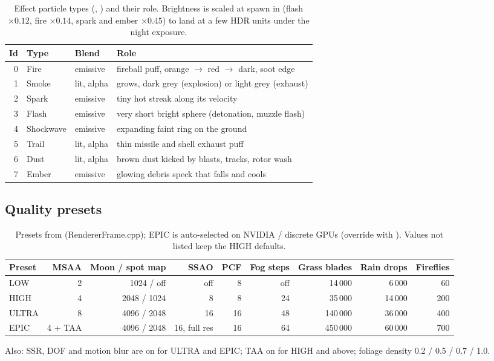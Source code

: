 \begin{table}[h]
\centering\small
\caption{Effect particle types (, ) and their role. Brightness is scaled at spawn in
 (flash $\times0.12$, fire $\times0.14$, spark and ember $\times0.45$) to land at a few HDR units under the
night exposure.}
\label{tab:fx}
\begin{tabular}{@{}rllp{9.3cm}@{}}
\toprule
Id & Type & Blend & Role\\\midrule
0 & Fire & emissive & fireball puff, orange $\to$ red $\to$ dark, soot edge\\
1 & Smoke & lit, alpha & grows, dark grey (explosion) or light grey (exhaust)\\
2 & Spark & emissive & tiny hot streak along its velocity\\
3 & Flash & emissive & very short bright sphere (detonation, muzzle flash)\\
4 & Shockwave & emissive & expanding faint ring on the ground\\
5 & Trail & lit, alpha & thin missile and shell exhaust puff\\
6 & Dust & lit, alpha & brown dust kicked by blasts, tracks, rotor wash\\
7 & Ember & emissive & glowing debris speck that falls and cools\\\bottomrule
\end{tabular}
\end{table}

\subsection{Quality presets}
\begin{table}[h]
\centering\small
\caption{Presets from  (RendererFrame.cpp); EPIC is auto-selected on NVIDIA / discrete GPUs
(override with ). Values not listed keep the HIGH defaults.}
\label{tab:presets}
\begin{tabular}{@{}lrrrrrrrr@{}}
\toprule
Preset & MSAA & Moon / spot map & SSAO & PCF & Fog steps & Grass blades & Rain drops & Fireflies\\\midrule
LOW & 2 & 1024 / off & off & 8 & off & 14\,000 & 6\,000 & 60\\
HIGH & 4 & 2048 / 1024 & 8 & 8 & 24 & 35\,000 & 14\,000 & 200\\
ULTRA & 8 & 4096 / 2048 & 16 & 16 & 48 & 140\,000 & 36\,000 & 400\\
EPIC & 4 + TAA & 4096 / 2048 & 16, full res & 16 & 64 & 450\,000 & 60\,000 & 700\\\bottomrule
\end{tabular}
\end{table}
Also: SSR, DOF and motion blur are on for ULTRA and EPIC; TAA on for HIGH and above; foliage density 0.2 / 0.5 / 0.7 / 1.0.
